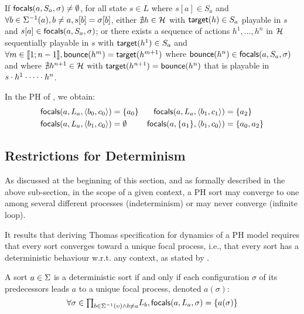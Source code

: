 \begin{proposition}
\label{pps:has-focals}
If $\mathsf{focals}(a,S_a,\sigma)\neq\emptyset$, for all
state $s\in L$
where
$s[a]\in S_a$ and
$\forall b\in \Sigma^{-1}(a), b\neq a, s[b] = \sigma[b]$,
either
$\nexists h\in\mathcal{H}$ with $\mathsf{target}(h)\in S_a$  playable in $s$ and
$s[a]\in\mathsf{focals}(a,S_a,\sigma)$;
or
there exists a sequence of actions $h^1,\dots,h^n$ in $\mathcal{H}$ sequentially playable in $s$ with
$\mathsf{target}(h^1)\in S_a$ and
$\forall m\in\llbracket 1 ; n-1 \rrbracket, \mathsf{bounce}(h^m)=\mathsf{target}(h^{m+1})$
where
 $\mathsf{bounce}(h^n) \in \mathsf{focals}(a,S_a,\sigma)$
 and
 where 
$\nexists h^{n+1}\in \mathcal{H}$ with $\mathsf{target}(h^{n+1})=\mathsf{bounce}(h^n)$ 
that is playable in $s\cdot h^1\cdot \cdots \cdot h^n$.
\end{proposition}



\begin{example}
In the PH of , we obtain:
\begin{align*}
\mathsf{focals}(a,L_a,\langle b_0,c_0 \rangle) &= \{ a_0 \}
&
\mathsf{focals}(a,L_a,\langle b_1,c_1 \rangle) &= \{ a_2 \}
\\
\mathsf{focals}(a,L_a,\langle b_1,c_0 \rangle) &= \emptyset
&
\mathsf{focals}(a,\{a_1\},\langle b_1,c_0 \rangle) &= \{ a_0, a_2 \}
\end{align*}
\end{example}

\subsection{Restrictions for Determinism} %
\label{ssec:dfocals}

As discussed at the beginning of this section, and as formally described in the above sub-section, 
in the scope of a given context,
a PH sort may converge to one among several different processes (indeterminism) or may never converge
(infinite loop).

It results that deriving Thomas specification for dynamics of a PH model
requires that every sort converges toward a unique focal process, i.e., that every sort has a
deterministic behaviour w.r.t. any context, as stated by .

\begin{property}\label{pro:deterministic-sort}
A sort $a\in\Sigma$ is a deterministic sort if and only if
each configuration $\sigma$ of its predecessors leads $a$ to a unique focal process,
denoted $a(\sigma)$:
\[
\forall \sigma \in {\textstyle\prod_{
b\in\Sigma^{-1}(\upsilon) \wedge b\neq a}}
L_{b},
\mathsf{focals}(a,L_a,\sigma) = \{ a(\sigma) \}\]
\end{property}


